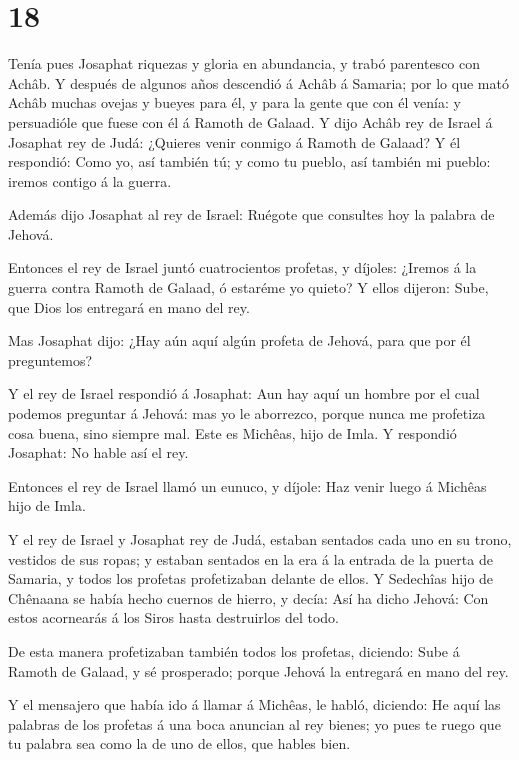 \hypertarget{section-17}{%
\section{18}\label{section-17}}

 Tenía pues Josaphat riquezas y gloria en abundancia, y
trabó parentesco con Achâb.  Y después de algunos años
descendió á Achâb á Samaria; por lo que mató Achâb muchas ovejas y
bueyes para él, y para la gente que con él venía: y persuadióle que
fuese con él á Ramoth de Galaad.  Y dijo Achâb rey de Israel
á Josaphat rey de Judá: ¿Quieres venir conmigo á Ramoth de Galaad? Y él
respondió: Como yo, así también tú; y como tu pueblo, así también mi
pueblo: iremos contigo á la guerra.

 Además dijo Josaphat al rey de Israel: Ruégote que
consultes hoy la palabra de Jehová.

 Entonces el rey de Israel juntó cuatrocientos profetas, y
díjoles: ¿Iremos á la guerra contra Ramoth de Galaad, ó estaréme yo
quieto? Y ellos dijeron: Sube, que Dios los entregará en mano del rey.

 Mas Josaphat dijo: ¿Hay aún aquí algún profeta de Jehová,
para que por él preguntemos?

 Y el rey de Israel respondió á Josaphat: Aun hay aquí un
hombre por el cual podemos preguntar á Jehová: mas yo le aborrezco,
porque nunca me profetiza cosa buena, sino siempre mal. Este es Michêas,
hijo de Imla. Y respondió Josaphat: No hable así el rey.

 Entonces el rey de Israel llamó un eunuco, y díjole: Haz
venir luego á Michêas hijo de Imla.

 Y el rey de Israel y Josaphat rey de Judá, estaban sentados
cada uno en su trono, vestidos de sus ropas; y estaban sentados en la
era á la entrada de la puerta de Samaria, y todos los profetas
profetizaban delante de ellos.  Y Sedechîas hijo de
Chênaana se había hecho cuernos de hierro, y decía: Así ha dicho Jehová:
Con estos acornearás á los Siros hasta destruirlos del todo.

 De esta manera profetizaban también todos los profetas,
diciendo: Sube á Ramoth de Galaad, y sé prosperado; porque Jehová la
entregará en mano del rey.

 Y el mensajero que había ido á llamar á Michêas, le habló,
diciendo: He aquí las palabras de los profetas á una boca anuncian al
rey bienes; yo pues te ruego que tu palabra sea como la de uno de ellos,
que hables bien.

